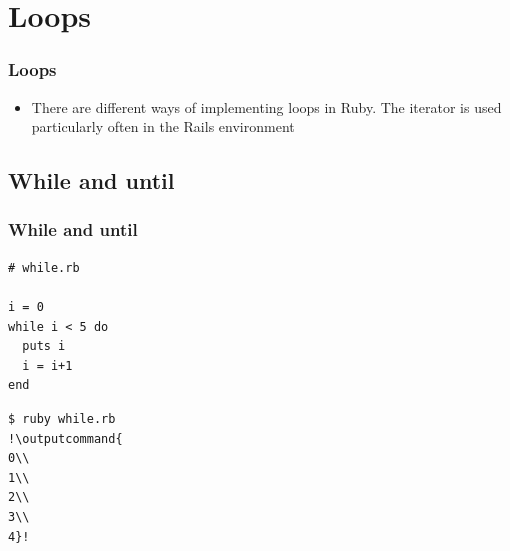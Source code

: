 \documentclass{beamer}
\newcommand{\outputcommand}[1]{\color{darkgreen}{#1}}
\begin{document}
\section{Loops}
\begin{frame}[fragile]
\frametitle{Loops}
\begin{itemize}
 \item There are different ways of implementing loops in Ruby. The iterator is used particularly often in the Rails environment
\end{itemize}

\end{frame}
\subsection{While and until}
\begin{frame}[fragile]
\frametitle{While and until}
\lstset{language=Ruby, style=eclipse}
\begin{lstlisting}[escapechar=&]
# while.rb

i = 0
while i < 5 do
  puts i
  i = i+1
end
\end{lstlisting}

\lstset{language=shell}
\begin{lstlisting}[numbers=none, escapechar=!]
$ ruby while.rb
!\outputcommand{
0\\
1\\
2\\
3\\
4}!
\end{lstlisting}
\end{frame}
\end{document}
